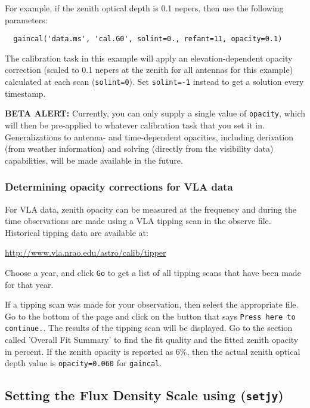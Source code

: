 For example, if the zenith optical depth is 0.1 nepers, then
use the following parameters:
\small
\begin{verbatim}
  gaincal('data.ms', 'cal.G0', solint=0., refant=11, opacity=0.1)
\end{verbatim}
\normalsize
The calibration task in this example will apply an
elevation-dependent opacity correction (scaled to 0.1 nepers at the
zenith for all antennas for this example) calculated at each scan
({\tt solint=0}).  Set {\tt solint=-1} instead to get a solution 
every timestamp.

{\bf BETA ALERT:} Currently, you can only supply a single value
of {\tt opacity}, which will then be pre-applied to whatever 
calibration task that you set it in.
Generalizations to antenna- and time-dependent opacities, including
derivation (from weather information) and solving (directly from the
visibility data) capabilities, will be made available in the future.

\subsubsection{Determining opacity corrections for VLA data}
\label{section:cal.prior.opacity.vla}

For VLA data, zenith opacity can be measured at the frequency
and during the time observations are made using a VLA tipping scan in
the observe file.  Historical tipping data are available at:

\url{http://www.vla.nrao.edu/astro/calib/tipper}

Choose a year, and click {\tt Go} to get a list of all tipping scans
that have been made for that year.

If a tipping scan was made for your observation, then select the
appropriate file.  Go to the bottom of the page and click on the
button that says {\tt Press here to continue.}.  The results of the
tipping scan will be displayed.  Go to the section called 'Overall Fit
Summary' to find the fit quality and the fitted zenith opacity in
percent.  If the zenith opacity is reported as 6\%, then the actual
zenith optical depth value is {\tt opacity=0.060} for {\tt gaincal}.

\subsection{Setting the Flux Density Scale using ({\tt setjy})}
\label{section:cal.prior.models}

